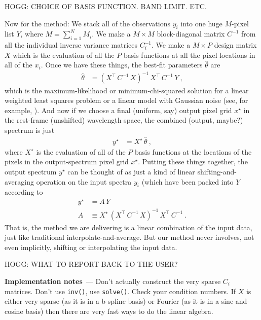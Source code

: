 \documentclass[11pt]{article}
\renewcommand{\paragraph}[1]{\medskip\par\noindent\textbf{#1}~---}
\begin{document}
HOGG: CHOICE OF BASIS FUNCTION. BAND LIMIT. ETC.

Now for the method:
We stack all of the observations $y_i$ into one huge $M$-pixel list $Y$, where $M=\sum_{i=1}^N M_i$.
We make a $M\times M$ block-diagonal matrix $C^{-1}$ from all the individual inverse variance matrices $C_i^{-1}$.
We make a $M\times P$ design matrix $X$ which is the evaluation of all the $P$ basis functions at all the pixel locations in all of the $x_i$.
Once we have these things, the best-fit parameters $\hat\theta$ are
\begin{align}
    \hat\theta &= (X^\top\,C^{-1}\,X)^{-1}\,X^\top\,C^{-1}\,Y ~,
\end{align}
which is the maximum-likelihood or minimum-chi-squared solution for a linear weighted least squares problem or a linear model with Gaussian noise (see, for example, \cite{hoggfitting}).
And now if we choose a final (uniform, say) output pixel grid $x^\star$ in the rest-frame (unshifted) wavelength space, the combined (output, maybe?) spectrum is just
\begin{align}
    y^\star &= X^\star\,\hat\theta ~,
\end{align}
where $X^\star$ is the evaluation of all of the $P$ basis functions at the locations of the pixels in the output-spectrum pixel grid $x^\star$.
Putting these things together, the output spectrum $y^\star$ can be thought of as just a kind of linear shifting-and-averaging operation on the input spectra $y_i$ (which have been packed into $Y$ according to
\begin{align}
    y^\star &= A\,Y \\
    A &\equiv X^\star\,(X^\top\,C^{-1}\,X)^{-1}\,X^\top\,C^{-1} ~.
\end{align}
That is, the method we are delivering is a linear combination of the input data, just like traditional interpolate-and-average.
But our method never involves, not even implicitly, shifting or interpolating the input data.

HOGG: WHAT TO REPORT BACK TO THE USER?

\paragraph{Implementation notes}
Don't actually construct the very sparse $C_i$ matrices.
Don't use \texttt{inv()}, use \texttt{solve()}.
Check your condition numbers.
If $X$ is either very sparse (as it is in a b-spline basis) or Fourier (as it is in a sine-and-cosine basis) then there are very fast ways to do the linear algebra.
\end{document}
